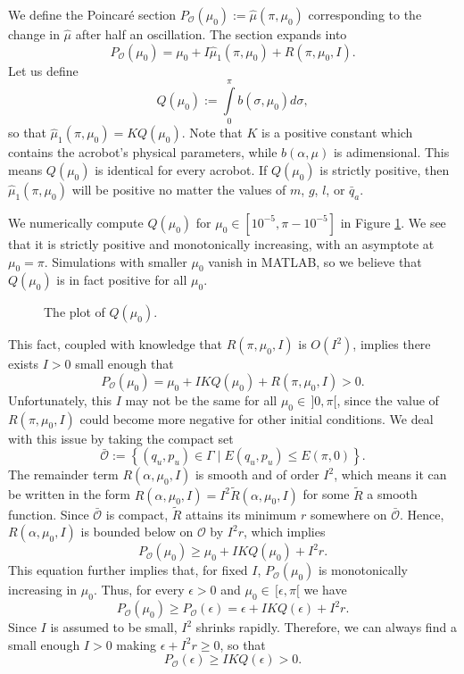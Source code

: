 We define the Poincar\'{e} section 
\(P_\mathcal{O}(\mu_0) := \hat{\mu}(\pi,\mu_0)\)
corresponding to the change in \(\hat{\mu}\) after half an oscillation.
The section expands into
\[
    P_\mathcal{O}(\mu_0) = \mu_0 + I \hat{\mu}_1(\pi,\mu_0) + R(\pi,\mu_0,I)
    .
\]
Let us define
\[
    Q(\mu_0) := \int \limits_0^\pi b(\sigma,\mu_0)d\sigma
    ,
\]
so that \(\hat{\mu}_1(\pi,\mu_0) = K Q(\mu_0)\).
Note that \(K\) is a positive constant which contains the acrobot's physical
parameters, while \(b(\alpha,\mu)\) is adimensional. 
This means \(Q(\mu_0)\) is identical for every acrobot.
If \(Q(\mu_0)\) is strictly positive, then \(\hat{\mu}_1(\pi,\mu_0)\) will be
positive no matter the values of \(m\), \(g\), \(l\), or \(\bar{q}_a\).

We numerically compute \(Q(\mu_0)\) for \(\mu_0 \in [10^{-5}, \pi - 10^{-5}]\)
in Figure \ref{fig:acrobot-Q}. 
We see that it is strictly positive and monotonically increasing, with
an asymptote at \(\mu_0 = \pi\). 
Simulations with smaller \(\mu_0\) vanish in MATLAB, so we believe that 
\(Q(\mu_0)\) is in fact positive for all \(\mu_0\).

\begin{figure}
    \centering
    \caption{The plot of \(Q(\mu_0)\).}
    \label{fig:acrobot-Q}
\end{figure}

This fact, coupled with knowledge that \(R(\pi,\mu_0,I)\) is \(O(I^2)\), 
implies there exists \(I > 0\) small enough that
\[
    P_\mathcal{O}(\mu_0) = \mu_0 + IKQ(\mu_0) + R(\pi,\mu_0,I) > 0
    .
\]
Unfortunately, this \(I\) may not be the
same for all \(\mu_0 \in \, ]0,\pi[\), since
the value of \(R(\pi,\mu_0,I)\) could become more negative
for other initial conditions.
We deal with this issue by taking the compact set
\[
    \bar{\mathcal{O}} := \left\{(q_u,p_u) \in \Gamma 
    \mid E(q_u,p_u) \leq E(\pi,0) \right\}
    .
\]
The remainder term \(R(\alpha,\mu_0,I)\) is smooth and of order \(I^2\),
which means it can be written in the form 
\(R(\alpha,\mu_0,I) = I^2\tilde{R}(\alpha,\mu_0,I)\)
for some \(\tilde{R}\) a smooth function.
Since \(\bar{\mathcal{O}}\) is compact, \(\tilde{R}\) attains its minimum
\({r}\) somewhere on \(\bar{\mathcal{O}}\).
Hence, \(R(\alpha,\mu_0,I)\) is bounded below on \(\mathcal{O}\) by
\(I^2{r}\), which implies 
\begin{equation}\label{eqn:acrobot-Po-lowerbound}
    P_\mathcal{O}(\mu_0) \geq \mu_0 + IKQ(\mu_0) + I^2{r}
    .
\end{equation}
This equation further implies that, for fixed \(I\),
\(P_\mathcal{O}(\mu_0)\) is monotonically increasing in \(\mu_0\).
Thus, for every \(\epsilon > 0\) and \(\mu_0 \in \, [\epsilon,\pi[\) we have
\[
    P_\mathcal{O}(\mu_0) \geq P_\mathcal{O}(\epsilon)
    = \epsilon + IKQ(\epsilon) + I^2{r}
    .
\]
Since \(I\) is assumed to be small, \(I^2\) shrinks rapidly.
Therefore, we can always find a small enough \(I > 0\) making 
\(\epsilon + I^2{r} \geq 0\), so that
\[
    P_\mathcal{O}(\epsilon) \geq IKQ(\epsilon) > 0
    .
\]

